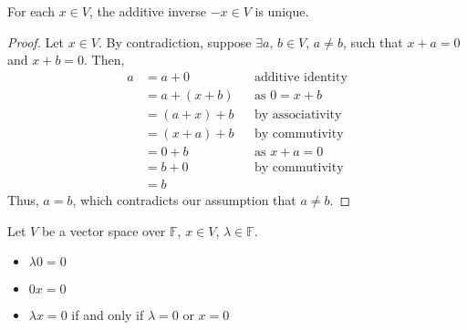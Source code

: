 \documentclass[letterpaper,12pt]{article}
\begin{document}
\begin{corollary}
For each $x \in V$, the additive inverse $-x \in V$ is unique.
\end{corollary}
\begin{proof}
Let $x \in V$. By contradiction, suppose $\exists a$, $b \in V$, $a \neq b$, such that $x + a = 0$ and $x + b = 0$. Then,
\begin{align*}
    a & = a + 0 && \text{additive identity} \\
    & = a + (x + b) && \text{as $0 = x + b$} \\
    & = (a + x) + b && \text{by associativity} \\
    & = (x + a) + b && \text{by commutivity} \\
    & = 0 + b && \text{as $x + a = 0$} \\
    & = b + 0 && \text{by commutivity} \\
    & = b
\end{align*}
Thus, $a = b$, which contradicts our assumption that $a \neq b$.
\end{proof}

\begin{theorem}
Let $V$ be a vector space over $\mathbb{F}$, $x \in V$, $\lambda \in \mathbb{F}$.
\begin{itemize}
    \item $\lambda 0 = 0$
    \item $0x = 0$
    \item $\lambda x = 0$ if and only if $\lambda = 0$ or $x = 0$
\end{itemize}
\end{theorem}
\end{document}
